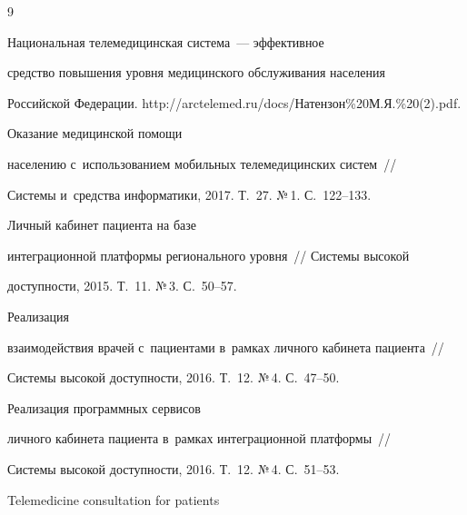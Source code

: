 {\small\frenchspacing


{%




\begin{thebibliography}{9}




 Национальная телемедицинская система~--- эффективное 


средство повышения уровня медицинского обслуживания населения 


Российской Федерации. {\sf http://arctelemed.ru/docs/Натензон\%20М.Я.\%20(2).pdf}.




 Оказание медицинской помощи 


населению с~использованием мобильных телемедицинских систем~/\!\!/ 


Системы и~средства информатики, 2017. Т.~27. №\,1. С.~122--133.




 Личный кабинет пациента на базе 


интеграционной платформы регионального уровня~/\!\!/ Системы высокой 


доступности, 2015. Т.~11. №\,3. С.~50--57.







 Реализация 


взаимодействия врачей с~пациентами в~рамках личного кабинета пациента~/\!\!/ 


Системы высокой доступности, 2016. Т.~12. №\,4. С.~47--50.




 Реализация программных сервисов 


личного кабинета пациента в~рамках интеграционной платформы~/\!\!/ 


Системы высокой доступности, 2016. Т.~12. №\,4. С.~51--53.










 Telemedicine consultation for patients 



\end{thebibliography}}}
